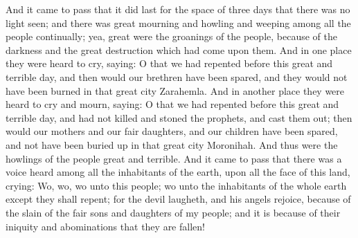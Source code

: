 And it came to pass that it did last for the space of three days that there was no light seen; and there was great mourning and howling and weeping among all the people continually; yea, great were the groanings of the people, because of the darkness and the great destruction which had come upon them.
\bverse \iffalse And in one place they were heard to cry, saying: O that we had repented before this great and terrible day, and then would our brethren have been spared, and they would not have been burned in that great city Zarahemla. \fi
And in one place they were heard to cry, saying: O that we had repented before this great and terrible day, and then would our brethren have been spared, and they would not have been burned in that great city Zarahemla.
\bverse \iffalse And in another place they were heard to cry and mourn, saying: O that we had repented before this great and terrible day, and had not killed and stoned the prophets, and cast them out; then would our mothers and our fair daughters, and our children have been spared, and not have been buried up in that great city Moronihah. And thus were the howlings of the people great and terrible. \fi
And in another place they were heard to cry and mourn, saying: O that we had repented before this great and terrible day, and had not killed and stoned the prophets, and cast them out; then would our mothers and our fair daughters, and our children have been spared, and not have been buried up in that great city Moronihah. And thus were the howlings of the people great and terrible.
\bchapter
\bverse \iffalse And it came to pass that there was a voice heard among all the inhabitants of the earth, upon all the face of this land, crying: \fi
And it came to pass that there was a voice heard among all the inhabitants of the earth, upon all the face of this land, crying:
\bverse \iffalse Wo, wo, wo unto this people; wo unto the inhabitants of the whole earth except they shall repent; for the devil laugheth, and his angels rejoice, because of the slain of the fair sons and daughters of my people; and it is because of their iniquity and abominations that they are fallen! \fi
Wo, wo, wo unto this people; wo unto the inhabitants of the whole earth except they shall repent; for the devil laugheth, and his angels rejoice, because of the slain of the fair sons and daughters of my people; and it is because of their iniquity and abominations that they are fallen!
\bverse \iffalse Behold, that great city Zarahemla have I burned with fire, and the inhabitants thereof. \fi
